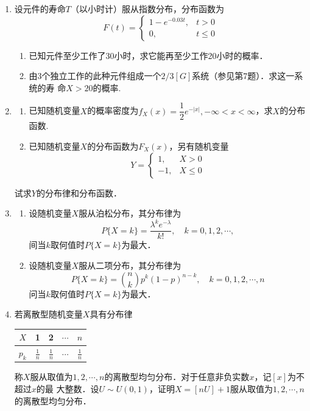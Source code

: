 \documentclass[10pt,a4paper]{article}
\begin{document}
\begin{enumerate}
    \item 设元件的寿命$T$（以小时计）服从指数分布，分布函数为
    $$F(t)=\left\{\begin{array}{ll}
        1-e^{-0.03t}, & t>0\\
        0, & t\leq 0
    \end{array}\right.$$
    \begin{enumerate}
        \item 已知元件至少工作了30小时，求它能再至少工作20小时的概率．
        \item 由3个独立工作的此种元件组成一个$2/3[G]$系统（参见第7题）．求这一系统的寿
        命$X>20$的概率.
    \end{enumerate}



    \item \begin{enumerate}
        \item 已知随机变量$X$的概率密度为$f_X(x)=\dfrac{1}{2}e^{-|x|},-\infty< x<\infty$，求$X$的分布函数.
        \item 已知随机变量$X$的分布函数为$F_X(x)$，另有随机变量
        $$Y=\left\{\begin{array}{ll}
            1, & X>0\\
            -1, & X\leq 0
        \end{array}\right.$$
    \end{enumerate}
    试求$Y$的分布律和分布函数．



    \item \begin{enumerate}
        \item 设随机变量$X$服从泊松分布，其分布律为
        $$P\{X=k\}=\frac{\lambda^ke^{-\lambda}}{k!},\quad k=0,1,2,\cdots,$$
        间当$k$取何值时$P\{X=k\}$为最大．
        \item 设随机变量$X$服从二项分布，其分布律为
        $$P\{X=k\}=\binom{n}{k}p^k(1-p)^{n-k},\quad k=0,1,2,\cdots,n$$
        问当$k$取何值时$P\{X=k\}$为最大．
    \end{enumerate}


    
    \item 若离散型随机变量$X$具有分布律
    \renewcommand{\arraystretch}{1.8}
    \begin{table}[H]\centering
        \begin{tabular}{c|cccc}

        $X$   & 1 & 2   & $\cdots$ & $n$   \\ \hline
        $p_k$ & $\displaystyle{\frac{1}{n}}$  & $\displaystyle{\frac{1}{n}}$ & $\cdots$ & $\displaystyle{\frac{1}{n}}$
        \end{tabular}
    \end{table}
        \vspace{-0.5cm}
        称$X$服从取值为$1,2,\cdots,n$的离散型均匀分布．对于任意非负实数$x$，记$[x]$为不超过$x$的最
        大整数．设$U\sim U(0,1)$，证明$X= [nU]+1$服从取值为$1,2,\cdots,n$的离散型均匀分布．
    \renewcommand{\arraystretch}{1}



\end{enumerate}
\end{document}
